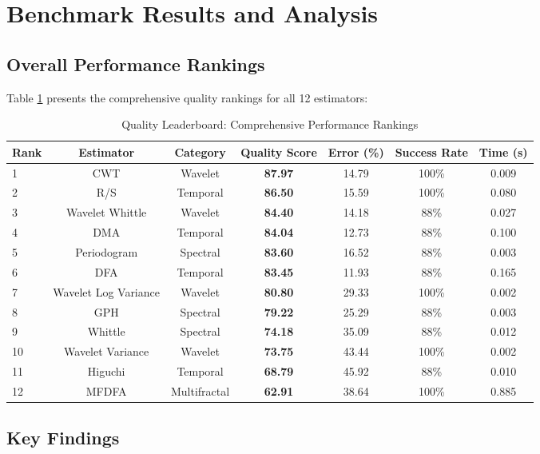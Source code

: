 \section{Benchmark Results and Analysis}

\subsection{Overall Performance Rankings}

Table \ref{tab:quality_leaderboard} presents the comprehensive quality rankings for all 12 estimators:

\begin{table}[h]
\centering
\caption{Quality Leaderboard: Comprehensive Performance Rankings}
\label{tab:quality_leaderboard}
\begin{tabular}{lcccccc}
\toprule
Rank & Estimator & Category & Quality Score & Error (\%) & Success Rate & Time (s) \\
\midrule
1 & CWT & Wavelet & \textbf{87.97} & 14.79 & 100\% & 0.009 \\
2 & R/S & Temporal & \textbf{86.50} & 15.59 & 100\% & 0.080 \\
3 & Wavelet Whittle & Wavelet & \textbf{84.40} & 14.18 & 88\% & 0.027 \\
4 & DMA & Temporal & \textbf{84.04} & 12.73 & 88\% & 0.100 \\
5 & Periodogram & Spectral & \textbf{83.60} & 16.52 & 88\% & 0.003 \\
6 & DFA & Temporal & \textbf{83.45} & 11.93 & 88\% & 0.165 \\
7 & Wavelet Log Variance & Wavelet & \textbf{80.80} & 29.33 & 100\% & 0.002 \\
8 & GPH & Spectral & \textbf{79.22} & 25.29 & 88\% & 0.003 \\
9 & Whittle & Spectral & \textbf{74.18} & 35.09 & 88\% & 0.012 \\
10 & Wavelet Variance & Wavelet & \textbf{73.75} & 43.44 & 100\% & 0.002 \\
11 & Higuchi & Temporal & \textbf{68.79} & 45.92 & 88\% & 0.010 \\
12 & MFDFA & Multifractal & \textbf{62.91} & 38.64 & 100\% & 0.885 \\
\bottomrule
\end{tabular}
\end{table}

\subsection{Key Findings}

